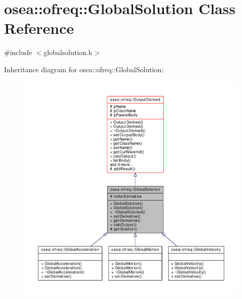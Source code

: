 \hypertarget{classosea_1_1ofreq_1_1_global_solution}{\section{osea\-:\-:ofreq\-:\-:Global\-Solution Class Reference}
\label{classosea_1_1ofreq_1_1_global_solution}
}


{\ttfamily \#include $<$globalsolution.\-h$>$}



Inheritance diagram for osea\-:\-:ofreq\-:\-:Global\-Solution\-:
\nopagebreak
\begin{figure}[H]
\begin{center}
\leavevmode
\includegraphics[width=350pt]{classosea_1_1ofreq_1_1_global_solution__inherit__graph}
\end{center}
\end{figure}
